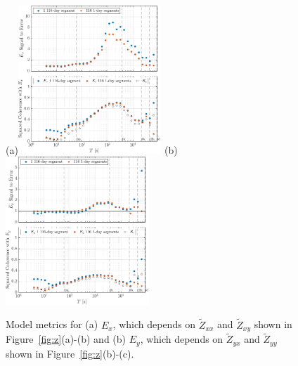 \documentclass[draft,linenumbers]{agujournal2018}
\begin{document}
\begin{figure}[h!]
  \caption{Magnitudes and phases for components of $\boldsymbol{\mathcal{\widetilde{Z}}}$: (a) $|\widetilde{Z}_{xx}|$ and $\phi_{xx}$; (b) $|\widetilde{Z}_{xy}|$ and $\phi_{xy}$; (c) $|\widetilde{Z}_{yx}|$ and $\phi_{yx}$; and (d) $|\widetilde{Z}_{yy}|$ and $\phi_{yy}$. Open circles on the lower part of the impedance amplitude error bars indicate that this formula yielded a value below zero. The gray background in plots shown in Figure~\ref{fig:z} corresponds to periods for which the signal-to-prediction error, shown in Figure~\ref{fig:se}, is greater than unity.}
  \label{fig:z}

  \subfigure(a){\includegraphics[width=0.48\textwidth]{figures/snplot-Middelpos-tf1;Middelpos-tf3-E_x.pdf}} 
  \subfigure(b){\includegraphics[width=0.48\textwidth]{figures/snplot-Middelpos-tf1;Middelpos-tf3-E_y.pdf}} 

  \caption{Model metrics for (a) $E_x$, which depends on $\widetilde{Z}_{xx}$ and $\widetilde{Z}_{xy}$ shown in Figure~\ref{fig:z}(a)-(b) and (b) $E_y$, which depends on $\widetilde{Z}_{yx}$ and $\widetilde{Z}_{yy}$ shown in  Figure~\ref{fig:z}(b)-(c).}
  \label{fig:se}

\end{figure}

\end{document}
